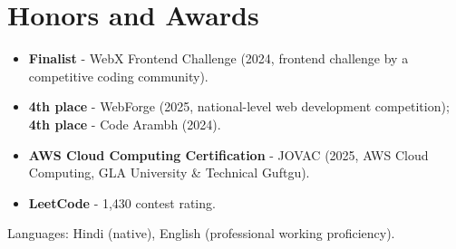 \documentclass[11pt,a4paper,sans]{moderncv}
\begin{document}
\section{Honors and Awards}
\vspace{1pt}
\begin{itemize}
    \item {\textbf{Finalist} - WebX Frontend Challenge (2024, frontend challenge by a competitive coding community).}
    \item {\textbf{4th place} - WebForge (2025, national-level web development competition); \textbf{4th place} - Code Arambh (2024).}
    \item {\textbf{AWS Cloud Computing Certification} - JOVAC (2025, AWS Cloud Computing, GLA University \& Technical Guftgu).}
    \item {\textbf{LeetCode} - 1,430 contest rating.}
\end{itemize}


\vspace{1pt}
\small{Languages: Hindi (native), English (professional working proficiency).}
\end{document}
